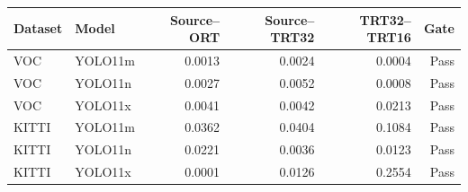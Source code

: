 \begin{tabular}{llrrrr}
\toprule
Dataset & Model & Source--ORT & Source--TRT32 & TRT32--TRT16 & Gate \\
\midrule
VOC & YOLO11m & 0.0013 & 0.0024 & 0.0004 & Pass \\
VOC & YOLO11n & 0.0027 & 0.0052 & 0.0008 & Pass \\
VOC & YOLO11x & 0.0041 & 0.0042 & 0.0213 & Pass \\
KITTI & YOLO11m & 0.0362 & 0.0404 & 0.1084 & Pass \\
KITTI & YOLO11n & 0.0221 & 0.0036 & 0.0123 & Pass \\
KITTI & YOLO11x & 0.0001 & 0.0126 & 0.2554 & Pass \\
\bottomrule
\end{tabular}
